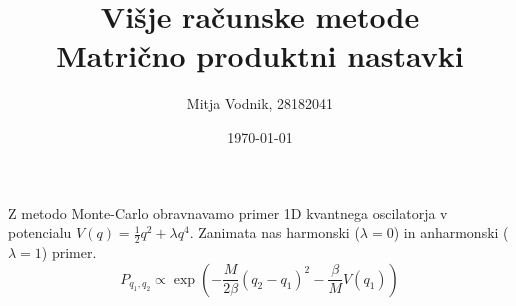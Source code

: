 \documentclass[a4paper]{article}
\newcommand{\half}{\frac{1}{2}}
\begin{document}
    \title{\sc\large Višje računske metode\\
		\bigskip
		\bf\Large Matrično produktni nastavki}
	\author{Mitja Vodnik, 28182041}
            \date{\today}
	\maketitle

    Z metodo Monte-Carlo obravnavamo primer 1D kvantnega oscilatorja v potencialu $V(q) = \half q^2 + \lambda q^4$.
    Zanimata nas harmonski ($\lambda = 0$) in anharmonski ($\lambda = 1$) primer. \\

    \begin{equation}\label{eq1}
        P_{q_1, q_2} \propto \exp \left( -\frac{M}{2\beta}(q_2 - q_1)^2 - \frac{\beta}{M}V(q_1) \right)
    \end{equation}

    \iffalse
    \begin{figure}
        \centering
        \begin{subfigure}{\textwidth}
            \texttt{[image: slika1.pdf]}
            \caption{}
        \end{subfigure}
        \begin{subfigure}{\textwidth}
            \texttt{[image: slika2.pdf]}
            \caption{}
        \end{subfigure}
        \caption{Rezultati simulacije termalnega stanja harmonskega oscilatorja.
        S $H_a$ je označena analitično izračunana vrednost povprečne energije.}
        \label{slika1}
    \end{figure}
    \fi
\end{document}
